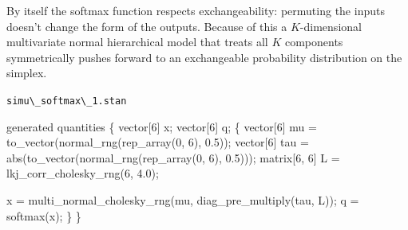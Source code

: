\documentclass[
  letterpaper,
  DIV=11,
  numbers=noendperiod]{scrartcl}
\newenvironment{Shaded}{\begin{snugshade}}{\end{snugshade}}
\newcommand{\AttributeTok}[1]{\textcolor[rgb]{0.40,0.45,0.13}{#1}}
\newcommand{\DataTypeTok}[1]{\textcolor[rgb]{0.68,0.00,0.00}{#1}}
\newcommand{\DecValTok}[1]{\textcolor[rgb]{0.68,0.00,0.00}{#1}}
\newcommand{\FloatTok}[1]{\textcolor[rgb]{0.68,0.00,0.00}{#1}}
\newcommand{\FunctionTok}[1]{\textcolor[rgb]{0.28,0.35,0.67}{#1}}
\newcommand{\KeywordTok}[1]{\textcolor[rgb]{0.00,0.23,0.31}{#1}}
\newcommand{\NormalTok}[1]{\textcolor[rgb]{0.00,0.23,0.31}{#1}}
\newcommand{\OtherTok}[1]{\textcolor[rgb]{0.00,0.23,0.31}{#1}}
\newcommand{\SpecialCharTok}[1]{\textcolor[rgb]{0.37,0.37,0.37}{#1}}
\newcommand{\StringTok}[1]{\textcolor[rgb]{0.13,0.47,0.30}{#1}}
\begin{document}
By itself the softmax function respects exchangeability: permuting the
inputs doesn't change the form of the outputs. Because of this a
\(K\)-dimensional multivariate normal hierarchical model that treats all
\(K\) components symmetrically pushes forward to an exchangeable
probability distribution on the simplex.

\begin{codelisting}

\caption{\texttt{simu\textbackslash\_softmax\textbackslash\_1.stan}}

\begin{Shaded}
\begin{Highlighting}[]
\KeywordTok{generated quantities}\NormalTok{ \{}
  \DataTypeTok{vector}\NormalTok{[}\DecValTok{6}\NormalTok{] x;}
  \DataTypeTok{vector}\NormalTok{[}\DecValTok{6}\NormalTok{] q;}
\NormalTok{  \{}
    \DataTypeTok{vector}\NormalTok{[}\DecValTok{6}\NormalTok{] mu = to\_vector(normal\_rng(rep\_array(}\DecValTok{0}\NormalTok{, }\DecValTok{6}\NormalTok{), }\FloatTok{0.5}\NormalTok{));}
    \DataTypeTok{vector}\NormalTok{[}\DecValTok{6}\NormalTok{] tau = abs(to\_vector(normal\_rng(rep\_array(}\DecValTok{0}\NormalTok{, }\DecValTok{6}\NormalTok{), }\FloatTok{0.5}\NormalTok{)));}
    \DataTypeTok{matrix}\NormalTok{[}\DecValTok{6}\NormalTok{, }\DecValTok{6}\NormalTok{] L = lkj\_corr\_cholesky\_rng(}\DecValTok{6}\NormalTok{, }\FloatTok{4.0}\NormalTok{);}

\NormalTok{    x = multi\_normal\_cholesky\_rng(mu, diag\_pre\_multiply(tau, L));}
\NormalTok{    q = softmax(x);}
\NormalTok{  \}}
\NormalTok{\}}
\end{Highlighting}
\end{Shaded}

\end{codelisting}

\begin{Shaded}
\end{Shaded}
\end{document}
